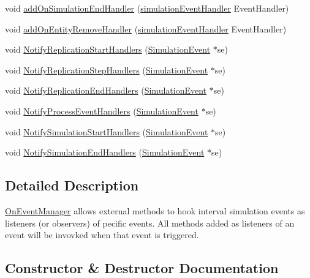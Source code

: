 \begin{DoxyCompactItemize}
void \hyperlink{class_on_event_manager_a8dcc243a2ab9fa15bc7fad1b230b596d}{add\+On\+Simulation\+End\+Handler} (\hyperlink{_on_event_manager_8h_a0ad7c994fb1fe11b3233f273a4d8c813}{simulation\+Event\+Handler} Event\+Handler)
\item 
void \hyperlink{class_on_event_manager_a8339db7c907e2a0a7ac161d758ea5d65}{add\+On\+Entity\+Remove\+Handler} (\hyperlink{_on_event_manager_8h_a0ad7c994fb1fe11b3233f273a4d8c813}{simulation\+Event\+Handler} Event\+Handler)
\item 
void \hyperlink{class_on_event_manager_a5d8be7dd06e944189658f918961554b3}{Notify\+Replication\+Start\+Handlers} (\hyperlink{class_simulation_event}{Simulation\+Event} $\ast$se)
\item 
void \hyperlink{class_on_event_manager_a2fe07e578bff9d56cf536d94d22d2c82}{Notify\+Replication\+Step\+Handlers} (\hyperlink{class_simulation_event}{Simulation\+Event} $\ast$se)
\item 
void \hyperlink{class_on_event_manager_aea1476daf888bec9c15c180c72d65848}{Notify\+Replication\+End\+Handlers} (\hyperlink{class_simulation_event}{Simulation\+Event} $\ast$se)
\item 
void \hyperlink{class_on_event_manager_ab0c4f9891843f2a5f998a3e37b001aee}{Notify\+Process\+Event\+Handlers} (\hyperlink{class_simulation_event}{Simulation\+Event} $\ast$se)
\item 
void \hyperlink{class_on_event_manager_aadccf8efdc248ef6ff8ff2826850b925}{Notify\+Simulation\+Start\+Handlers} (\hyperlink{class_simulation_event}{Simulation\+Event} $\ast$se)
\item 
void \hyperlink{class_on_event_manager_a018da7221c8d1761b86bfe523334aa8e}{Notify\+Simulation\+End\+Handlers} (\hyperlink{class_simulation_event}{Simulation\+Event} $\ast$se)
\end{DoxyCompactItemize}


\subsection{Detailed Description}
\hyperlink{class_on_event_manager}{On\+Event\+Manager} allows external methods to hook interval simulation events as listeners (or observers) of pecific events. All methods added as listeners of an event will be invovked when that event is triggered. 

\subsection{Constructor \& Destructor Documentation}
